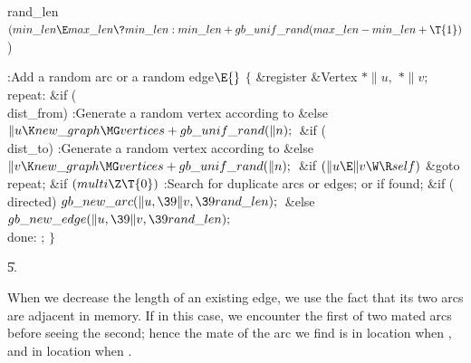 \B\D\\{rand\_len}\5
$(\\{min\_len}\E\\{max\_len}\?\\{min\_len}:\\{min\_len}+\\{gb\_unif\_rand}(%
\\{max\_len}-\\{min\_len}+\T{1}){}$)\par
\Y\B\4:Add a random arc or a random edge\X${}\E{}$\6
${}\{{}$\5
\1\&{register} \&{Vertex} ${}{*}\|u,{}$ ${}{*}\|v;{}$\7
\4\\{repeat}:\6
\&{if} (\\{dist\_from})\1\5
:Generate a random vertex  according to \X\2\6
\&{else}\1\5
${}\|u\K\\{new\_graph}\MG\\{vertices}+\\{gb\_unif\_rand}(\|n);{}$\2\6
\&{if} (\\{dist\_to})\1\5
:Generate a random vertex  according to \X\2\6
\&{else}\1\5
${}\|v\K\\{new\_graph}\MG\\{vertices}+\\{gb\_unif\_rand}(\|n);{}$\2\6
\&{if} ${}(\|u\E\|v\W\R\\{self}){}$\1\5
\&{goto} \\{repeat};\2\6
\&{if} ${}(\\{multi}\Z\T{0}){}$\1\5
:Search for duplicate arcs or edges;  or  if found\X;\2\6
\&{if} (\\{directed})\1\5
${}\\{gb\_new\_arc}(\|u,\39\|v,\39\\{rand\_len});{}$\2\6
\&{else}\1\5
${}\\{gb\_new\_edge}(\|u,\39\|v,\39\\{rand\_len});{}$\2\6
\4\\{done}:\5
;\6
\4${}\}{}$\2\par
\U5.\fi

When we decrease the length of an existing edge, we use the fact that
its two arcs are adjacent in memory. If  in this case, we
encounter
the first of two mated arcs before seeing the second; hence the mate of
the arc we find is in location  when , and in
location
 when .

